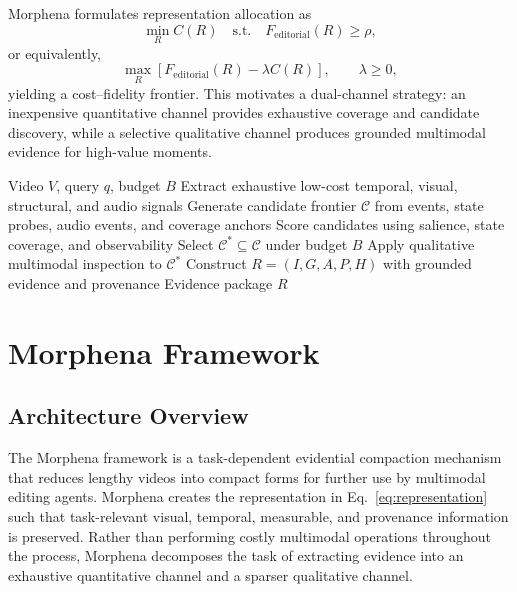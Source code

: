 \documentclass[conference]{IEEEtran}
\begin{document}
Morphena formulates representation allocation as
\begin{equation}
\min_R C(R)
\quad\text{s.t.}\quad
F_{\mathrm{editorial}}(R)\geq\rho,
\end{equation}
or equivalently,
\begin{equation}
\max_R\left[F_{\mathrm{editorial}}(R)-\lambda C(R)\right],
\qquad \lambda\geq0,
\end{equation}
yielding a cost--fidelity frontier. This motivates a dual-channel strategy: an inexpensive quantitative channel provides exhaustive coverage and candidate discovery, while a selective qualitative channel produces grounded multimodal evidence for high-value moments.

\begin{algorithm}[t]
\caption{Morphena Budgeted Evidence Construction}
\label{alg:morphena}
\begin{algorithmic}[1]
\REQUIRE Video $V$, query $q$, budget $B$
\STATE Extract exhaustive low-cost temporal, visual, structural, and audio signals
\STATE Generate candidate frontier $\mathcal{C}$ from events, state probes, audio events, and coverage anchors
\STATE Score candidates using salience, state coverage, and observability
\STATE Select $\mathcal{C}^{*}\subseteq\mathcal{C}$ under budget $B$
\STATE Apply qualitative multimodal inspection to $\mathcal{C}^{*}$
\STATE Construct $R=(I,G,A,P,H)$ with grounded evidence and provenance
\RETURN Evidence package $R$
\end{algorithmic}
\end{algorithm}


\section{Morphena Framework}

\subsection{Architecture Overview}

The Morphena framework is a task-dependent evidential compaction mechanism that reduces lengthy videos into compact forms for further use by multimodal editing agents. Morphena creates the representation in Eq.~\ref{eq:representation} such that task-relevant visual, temporal, measurable, and provenance information is preserved. Rather than performing costly multimodal operations throughout the process, Morphena decomposes the task of extracting evidence into an exhaustive quantitative channel and a sparser qualitative channel.
\end{document}
